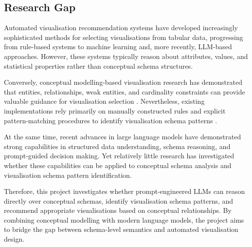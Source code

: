 

\subsection{Research Gap}

Automated visualisation recommendation systems have developed increasingly sophisticated methods for selecting visualisations from tabular data, progressing from rule-based systems to machine learning and, more recently, LLM-based approaches. However, these systems typically reason about attributes, values, and statistical properties rather than conceptual schema structures.

Conversely, conceptual modelling-based visualisation research has demonstrated that entities, relationships, weak entities, and cardinality constraints can provide valuable guidance for visualisation selection \cite{brientowards}. Nevertheless, existing implementations rely primarily on manually constructed rules and explicit pattern-matching procedures to identify visualisation schema patterns \cite{bull2023visualisation, hannan2024vizer}.

At the same time, recent advances in large language models have demonstrated strong capabilities in structured data understanding, schema reasoning, and prompt-guided decision making. Yet relatively little research has investigated whether these capabilities can be applied to conceptual schema analysis and visualisation schema pattern identification.

Therefore, this project investigates whether prompt-engineered LLMs can reason directly over conceptual schemas, identify visualisation schema patterns, and recommend appropriate visualisations based on conceptual relationships. By combining conceptual modelling with modern language models, the project aims to bridge the gap between schema-level semantics and automated visualisation design.

